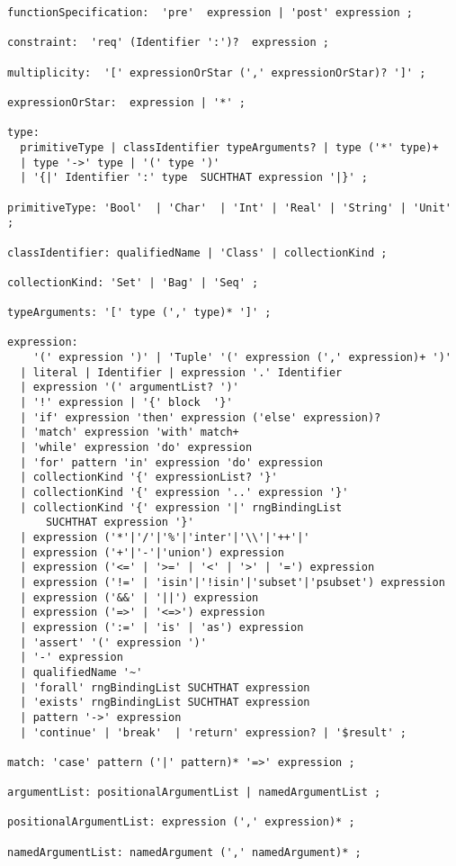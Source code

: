 {\begin{verbatim}
functionSpecification:  'pre'  expression | 'post' expression ;

constraint:  'req' (Identifier ':')?  expression ;

multiplicity:  '[' expressionOrStar (',' expressionOrStar)? ']' ;

expressionOrStar:  expression | '*' ;

type:
  primitiveType | classIdentifier typeArguments? | type ('*' type)+       
  | type '->' type | '(' type ')' 
  | '{|' Identifier ':' type  SUCHTHAT expression '|}' ;

primitiveType: 'Bool'  | 'Char'  | 'Int' | 'Real' | 'String' | 'Unit' ;

classIdentifier: qualifiedName | 'Class' | collectionKind ;

collectionKind: 'Set' | 'Bag' | 'Seq' ;

typeArguments: '[' type (',' type)* ']' ;

expression: 
    '(' expression ')' | 'Tuple' '(' expression (',' expression)+ ')' 
  | literal | Identifier | expression '.' Identifier 
  | expression '(' argumentList? ')' 
  | '!' expression | '{' block  '}' 
  | 'if' expression 'then' expression ('else' expression)? 
  | 'match' expression 'with' match+  
  | 'while' expression 'do' expression  
  | 'for' pattern 'in' expression 'do' expression 
  | collectionKind '{' expressionList? '}' 
  | collectionKind '{' expression '..' expression '}' 
  | collectionKind '{' expression '|' rngBindingList 
      SUCHTHAT expression '}' 
  | expression ('*'|'/'|'%'|'inter'|'\\'|'++'|'
  | expression ('+'|'-'|'union') expression 
  | expression ('<=' | '>=' | '<' | '>' | '=') expression
  | expression ('!=' | 'isin'|'!isin'|'subset'|'psubset') expression 
  | expression ('&&' | '||') expression 
  | expression ('=>' | '<=>') expression 
  | expression (':=' | 'is' | 'as') expression 
  | 'assert' '(' expression ')' 
  | '-' expression 
  | qualifiedName '~' 
  | 'forall' rngBindingList SUCHTHAT expression 
  | 'exists' rngBindingList SUCHTHAT expression 
  | pattern '->' expression 
  | 'continue' | 'break'  | 'return' expression? | '$result' ;

match: 'case' pattern ('|' pattern)* '=>' expression ;

argumentList: positionalArgumentList | namedArgumentList ;

positionalArgumentList: expression (',' expression)* ;

namedArgumentList: namedArgument (',' namedArgument)* ;


\end{verbatim}}
